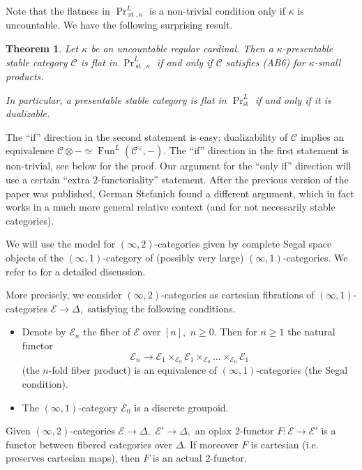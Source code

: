 \documentclass[11pt,leqno]{amsart}
\newtheorem{theo}{Theorem}[section]
\numberwithin{equation}{section}
\newcommand{\st}{\operatorname{st}}
\newcommand{\cC}{{\mathcal C}}
\newcommand{\cE}{{\mathcal E}}
\newcommand{\Fun}{\operatorname{Fun}}
\begin{document}
Note that the flatness in $\Pr^L_{\st,\kappa}$ is a non-trivial condition only if $\kappa$ is uncountable. We have the following surprising result.

\begin{theo}\label{th:flat=dualizable}
Let $\kappa$ be an uncountable regular cardinal. Then a $\kappa$-presentable stable category $\cC$ is flat in $\Pr^L_{\st,\kappa}$ if and only if $\cC$ satisfies (AB6) for $\kappa$-small products.  

In particular, a presentable stable category is flat in $\Pr^L_{\st}$ if and only if it is dualizable.
\end{theo}

The ``if'' direction in the second statement is easy: dualizability of $\cC$ implies an equivalence $\cC\otimes -\simeq \Fun^{L}(\cC^{\vee},-).$ The ``if'' direction in the first statement is non-trivial, see below for the proof. Our argument for the ``only if'' direction will use a certain ``extra $2$-functoriality'' statement. After the previous version of the paper was published, German Stefanich found a different argument, which in fact works in a much more general relative context (and for not necessarily stable categories).

We will use the model for $(\infty,2)$-categories given by complete Segal space objects of the $(\infty,1)$-category of (possibly very large) $(\infty,1)$-categories. We refer to \cite[Section 1]{Lur09b} for a detailed discussion.

More precisely, we consider $(\infty,2)$-categories as cartesian fibrations of $(\infty,1)$-categories $\cE\to\Delta,$  satisfying the following conditions.

\begin{itemize}
\item Denote by $\cE_n$ the fiber of $\cE$ over $[n],$ $n\geq 0.$ Then for $n\geq 1$ the natural functor $$\cE_n\to \cE_1\times_{\cE_0}\cE_1\times_{\cE_0}\dots\times_{\cE_0}\cE_1$$
(the $n$-fold fiber product) is an equivalence of $(\infty,1)$-categories (the Segal condition).

\item The $(\infty,1)$-category $\cE_0$ is a discrete groupoid.
\end{itemize} 

Given $(\infty,2)$-categories $\cE\to\Delta,$ $\cE'\to\Delta,$ an oplax $2$-functor $F:\cE\to\cE'$ is a functor between fibered categories over $\Delta.$ If moreover $F$ is cartesian (i.e. preserves cartesian maps), then $F$ is an actual $2$-functor. 
\end{document}
